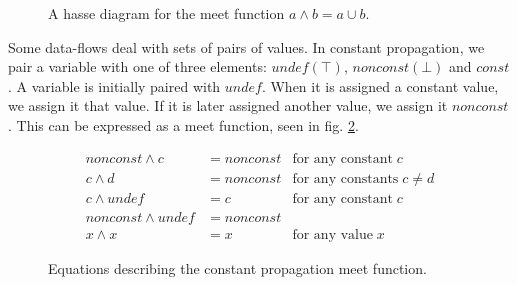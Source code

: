 \documentclass[bsc,twoside,singlespacing,parskip,logo,notimes,normalheadings]{infthesis}
\begin{document}
        \begin{figure}[ht]
          \centering
          \caption{A hasse diagram for the meet function $a \land b = a \cup b$.}
          \label{meethasse}
        \end{figure}
        
        Some data-flows deal with sets of pairs of values. In constant
        propagation, we pair a variable with one of three elements:
        $undef (\top)$, $nonconst (\bot)$ and $const$. A variable is
        initially paired with $undef$. When it is assigned a constant
        value, we assign it that value. If it is later assigned
        another value, we assign it $nonconst$. This can be expressed
        as a meet function, seen in fig. \ref{constmeet}.
        
        \begin{figure}[!ht]
        \begin{align}
        nonconst \land c &= nonconst & \text{for any constant} \; c \\
        c \land d &= nonconst &\text{for any constants} \; c \neq d \\
        c \land undef &= c &\text{for any constant} \; c \\
        nonconst \land undef &= nonconst & \\
        x \land x &= x &\text{for any value} \; x
        \end{align}
        \caption{Equations describing the constant propagation meet function.}
        \label{constmeet}
        \end{figure}
        
\end{document}
